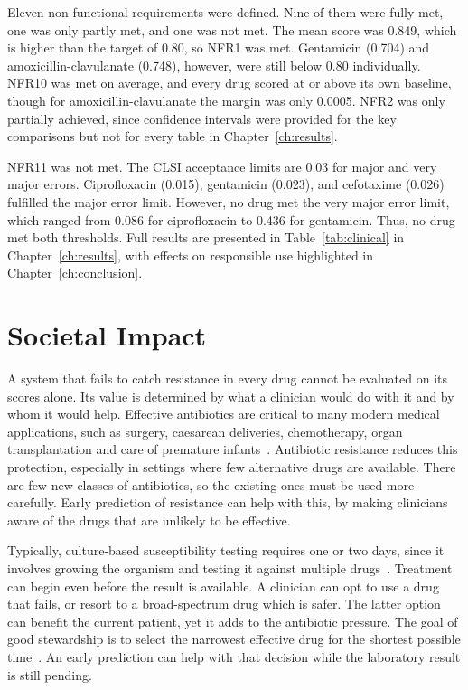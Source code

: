 Eleven non-functional requirements were defined. Nine of them were fully met, one was only
partly met, and one was not met. The mean score was 0.849, which is higher than the target of
0.80, so NFR1 was
met. Gentamicin (0.704) and amoxicillin-clavulanate (0.748), however, were still below 0.80
individually. NFR10 was met on average, and every drug scored at or above its own baseline,
though for amoxicillin-clavulanate the margin was only 0.0005. NFR2 was only partially
achieved, since confidence intervals were provided for the key comparisons but not for every
table in Chapter~\ref{ch:results}.

NFR11 was not met. The CLSI acceptance limits are 0.03 for major and very major errors.
Ciprofloxacin (0.015), gentamicin (0.023), and cefotaxime (0.026) fulfilled the major error
limit. However, no drug met the very major error limit, which ranged from 0.086 for
ciprofloxacin to 0.436 for gentamicin. Thus, no drug met both thresholds. Full results are
presented in Table~\ref{tab:clinical} in Chapter~\ref{ch:results}, with effects on responsible
use highlighted in Chapter~\ref{ch:conclusion}.

\section{Societal Impact}
\label{sec:societal}

A system that fails to catch resistance in every drug cannot be evaluated on its scores alone.
Its value is determined by what a clinician would do with it and by whom it would help.
Effective antibiotics are critical to many modern medical applications, such as surgery,
caesarean deliveries, chemotherapy, organ transplantation and care of premature
infants~\cite{who_amr_2019}. Antibiotic resistance reduces this protection, especially in
settings where few alternative drugs are available. There are few new classes of antibiotics,
so the existing ones must be used more carefully. Early prediction of resistance can help with
this, by making clinicians aware of the drugs that are unlikely to be effective.

Typically, culture-based susceptibility testing requires one or two days, since it involves
growing the organism and testing it against multiple drugs~\cite{Kim2022, Ren2022}. Treatment
can begin even before the result is available. A clinician can opt to use a drug that fails, or
resort to a broad-spectrum drug which is safer. The latter option can benefit the current
patient, yet it adds to the antibiotic pressure. The goal of good stewardship is to select the
narrowest effective drug for the shortest possible time~\cite{who_amr_2019}. An early
prediction can help with that decision while the laboratory result is still pending.

